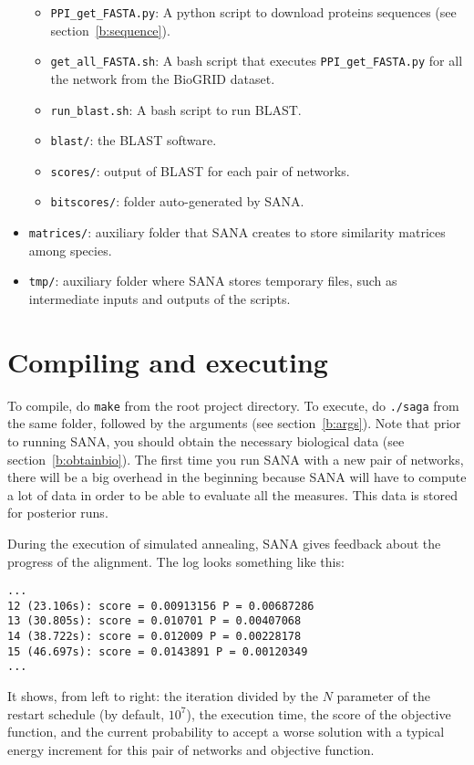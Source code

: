 \documentclass[]{article}
\begin{document}
\begin{itemize}
\begin{itemize}
\item \texttt{PPI\_get\_FASTA.py}: A python script to download proteins sequences (see section~\ref{b:sequence}).
\item\texttt{get\_all\_FASTA.sh}: A bash script that executes \texttt{PPI\_get\_FASTA.py} for all the network from the BioGRID dataset.
\item\texttt{run\_blast.sh}: A bash script to run BLAST.
\item\texttt{blast/}: the BLAST software.
\item\texttt{scores/}: output of BLAST for each pair of networks.
\item\texttt{bitscores/}: folder auto-generated by SANA.
\end{itemize}
\item\verb|matrices/|: auxiliary folder that SANA creates to store similarity matrices among species.
\item\verb|tmp/|: auxiliary folder where SANA stores temporary files, such as intermediate inputs and outputs of the scripts.
\end{itemize}
\section{Compiling and executing}
To compile, do \texttt{make} from the root project directory. To execute, do \texttt{./saga} from the same folder, followed by the arguments (see section~\ref{b:args}). Note that prior to running SANA, you should obtain the necessary biological data (see section~\ref{b:obtainbio}). The first time you run SANA with a new pair of networks, there will be a big overhead in the beginning because SANA will have to compute a lot of data in order to be able to evaluate all the measures. This data is stored for posterior runs.

During the execution of simulated annealing, SANA gives feedback about the progress of the alignment. The log looks something like this:
\begin{verbatim}
...
12 (23.106s): score = 0.00913156 P = 0.00687286
13 (30.805s): score = 0.010701 P = 0.00407068
14 (38.722s): score = 0.012009 P = 0.00228178
15 (46.697s): score = 0.0143891 P = 0.00120349
...
\end{verbatim}
It shows, from left to right: the iteration divided by the $N$ parameter of the restart schedule (by default, $10^7$), the execution time, the score of the objective function, and the current probability to accept a worse solution with a typical energy increment for this pair of networks and objective function.
 
\end{document}
